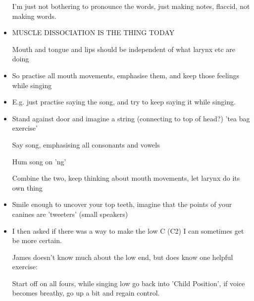 \documentclass[14pt,a4paper]{memoir}
\begin{document}
\begin{itemize}
    I'm just not bothering to pronounce the words, just making notes, flaccid, not making words.

  \item MUSCLE DISSOCIATION IS THE THING TODAY

    Mouth and tongue and lips should be independent of what larynx etc are doing

  \item So practise all mouth movements, emphasise them, and keep those feelings while singing

  \item E.g. just practise saying the song, and try to keep saying it while singing.

  \item Stand against door and imagine a string (connecting to top of head?) 'tea bag exercise'

    Say song, emphasising all consonants and vowels

    Hum song on 'ng'

    Combine the two, keep thinking about mouth movements, let larynx do its own thing

  \item Smile enough to uncover your top teeth, imagine that the points of your canines are 'tweeters' (small speakers)


  \item I then asked if there was a way to make the low C (C2) I can sometimes get be more certain.

  James doesn't know much about the low end, but does know one helpful exercise:

  Start off on all fours, while singing low go back into 'Child Position', if voice becomes breathy, go up a bit and regain control.
  

\end{itemize}
\end{document}
